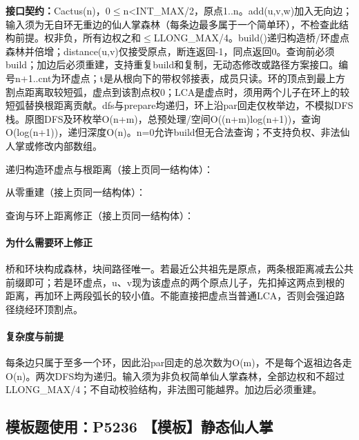 {\sloppy{}\noindent\textbf{接口契约：}Cactus(n)，0$\le$n<INT\_MAX/2，原点1..n。add(u,v,w)加入无向边；输入须为无自环无重边的仙人掌森林（每条边最多属于一个简单环），不检查此结构前提。权非负，所有边权之和$\le$LLONG\_MAX/4。build()递归构造桥/环虚点森林并倍增；distance(u,v)仅接受原点，断连返回-1，同点返回0。查询前必须build；加边后必须重建，支持重复build和复制，无动态修改或路径方案接口。编号n+1..cnt为环虚点；t是从根向下的带权邻接表，成员只读。环的顶点到最上方割点距离取较短弧，虚点到该割点权0；LCA是虚点时，须用两个儿子在环上的较短弧替换根距离贡献。dfs与prepare均递归，环上沿par回走仅枚举边，不模拟DFS栈。原图DFS及环枚举O(n+m)，总预处理/空间O((n+m)log(n+1))，查询O(log(n+1))，递归深度O(n)。n=0允许build但无合法查询；不支持负权、非法仙人掌或修改内部数组。\par}



\newpage\noindent 递归构造环虚点与根距离（接上页同一结构体）：



\newpage\noindent 从零重建（接上页同一结构体）：



\newpage\noindent 查询与环上距离修正（接上页同一结构体）：



\paragraph{为什么需要环上修正} 桥和环块构成森林，块间路径唯一。若最近公共祖先是原点，两条根距离减去公共前缀即可；若是环虚点，u、v现为该虚点的两个原点儿子，先扣掉这两点到根的距离，再加环上两段弧长的较小值。不能直接把虚点当普通LCA，否则会强迫路径绕经环顶割点。

\paragraph{复杂度与前提} 每条边只属于至多一个环，因此沿par回走的总次数为O(m)，不是每个返祖边各走O(n)。两次DFS均为递归。输入须为非负权简单仙人掌森林，全部边权和不超过LLONG\_MAX/4；不自动校验结构，非法图可能越界。加边后必须重建。

\Needspace{397pt}

\subsection*{模板题使用：P5236 【模板】静态仙人掌}

